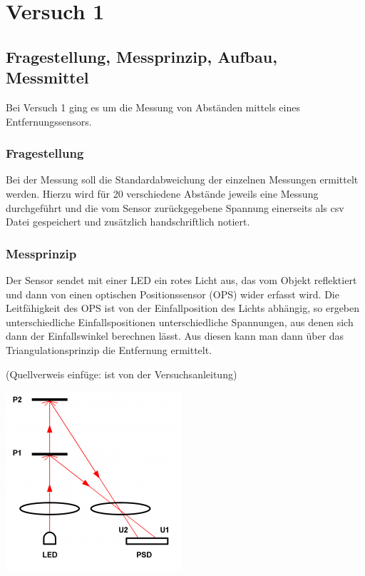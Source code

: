 \chapter{Versuch 1}
\label{chap:VERSUCH_1}

\section{Fragestellung, Messprinzip, Aufbau, Messmittel}
\label{chap:VERSUCH_1_FRAGESTELLUNG}

Bei Versuch 1 ging es um die Messung von Abständen mittels eines Entfernungssensors. 

\subsection*{Fragestellung}
	Bei der Messung soll die Standardabweichung der einzelnen Messungen ermittelt werden. Hierzu wird für 20 verschiedene Abstände jeweils eine Messung durchgeführt und die vom Sensor zurückgegebene Spannung einerseits als csv Datei gespeichert und zusätzlich handschriftlich notiert.

\pagebreak	
\subsection*{Messprinzip}
	Der Sensor sendet mit einer LED ein rotes Licht aus, das vom Objekt reflektiert und dann von einen optischen Positionssensor (OPS) wider erfasst wird. Die Leitfähigkeit des OPS ist von der Einfallposition des Lichts abhängig, so ergeben unterschiedliche Einfallspositionen unterschiedliche Spannungen, aus denen sich dann der Einfallswinkel berechnen lässt. Aus diesen kann man dann über das Triangulationsprinzip die Entfernung ermittelt.
	
	(Quellverweis einfüge: ist von der Versuchsanleitung)
	\begin{center}
	\includegraphics[scale=1]{media/triangulationGraphik.png}
	\label{Triangulation}
	\end{center}
	
